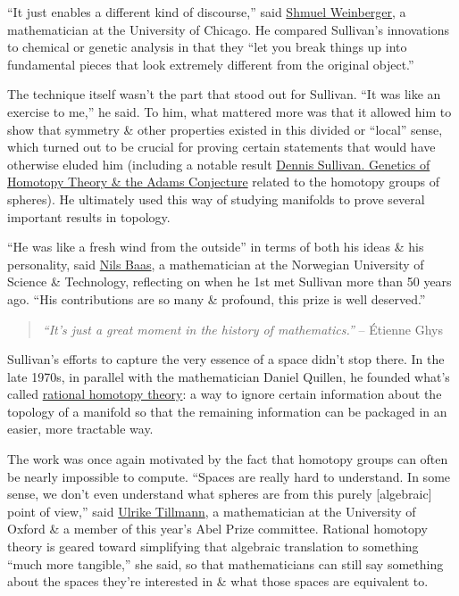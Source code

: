 \documentclass[oneside]{book}
\numberwithin{equation}{section}
\begin{document}
``It just enables a different kind of discourse,'' said \href{http://www.math.uchicago.edu/~shmuel/}{Shmuel Weinberger}, a mathematician at the University of Chicago. He compared Sullivan's innovations to chemical or genetic analysis in that they ``let you break things up into fundamental pieces that look extremely different from the original object.''

The technique itself wasn't the part that stood out for Sullivan. ``It was like an exercise to me,'' he said. To him, what mattered more was that it allowed him to show that symmetry \& other properties existed in this divided or ``local'' sense, which turned out to be crucial for proving certain statements that would have otherwise eluded him (including a notable result \href{https://www.jstor.org/stable/1970841?origin=JSTOR-pdf}{Dennis Sullivan. Genetics of Homotopy Theory \& the Adams Conjecture} related to the homotopy groups of spheres). He ultimately used this way of studying manifolds to prove several important results in topology.

``He was like a fresh wind from the outside'' in terms of both his ideas \& his personality, said \href{https://www.ntnu.edu/employees/nils.baas}{Nils Baas}, a mathematician at the Norwegian University of Science \& Technology, reflecting on when he 1st met Sullivan more than 50 years ago. ``His contributions are so many \& profound, this prize is well deserved.''

\begin{quotation}
	\textit{``It's just a great moment in the history of mathematics.''} -- \'Etienne Ghys
\end{quotation}
Sullivan's efforts to capture the very essence of a space didn't stop there. In the late 1970s, in parallel with the mathematician Daniel Quillen, he founded what's called \href{https://link.springer.com/article/10.1007/BF02684341}{rational homotopy theory}: a way to ignore certain information about the topology of a manifold so that the remaining information can be packaged in an easier, more tractable way.

The work was once again motivated by the fact that homotopy groups can often be nearly impossible to compute. ``Spaces are really hard to understand. In some sense, we don't even understand what spheres are from this purely [algebraic] point of view,'' said \href{https://people.maths.ox.ac.uk/tillmann/}{Ulrike Tillmann}, a mathematician at the University of Oxford \& a member of this year's Abel Prize committee. Rational homotopy theory is geared toward simplifying that algebraic translation to something ``much more tangible,'' she said, so that mathematicians can still say something about the spaces they're interested in \& what those spaces are equivalent to.
\end{document}
